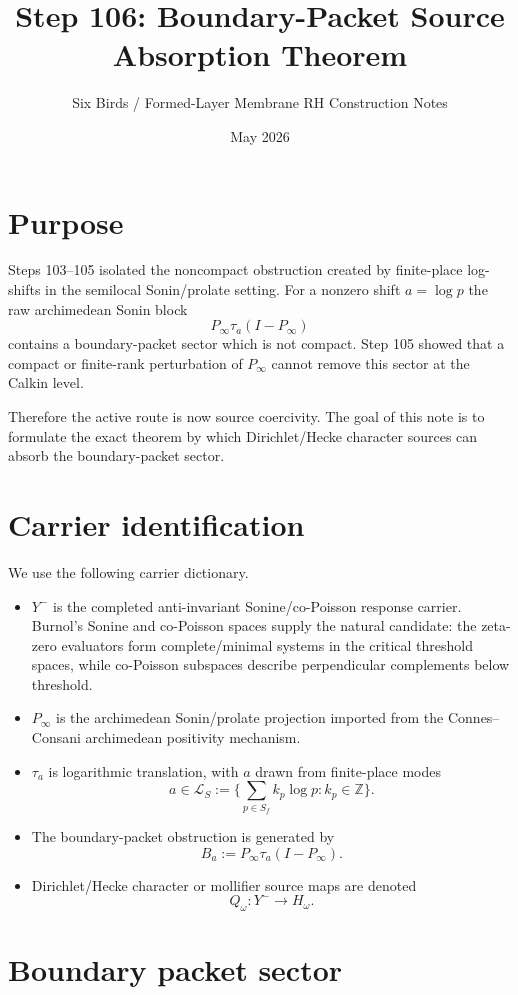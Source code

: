 \documentclass[11pt]{article}
\title{Step 106: Boundary-Packet Source Absorption Theorem}
\author{Six Birds / Formed-Layer Membrane RH Construction Notes}
\date{May 2026}
\begin{document}
\maketitle

\section{Purpose}
Steps 103--105 isolated the noncompact obstruction created by finite-place log-shifts in the semilocal Sonin/prolate setting.  For a nonzero shift $a=\log p$ the raw archimedean Sonin block
\[
  P_\infty\tau_a(I-P_\infty)
\]
contains a boundary-packet sector which is not compact.  Step 105 showed that a compact or finite-rank perturbation of $P_\infty$ cannot remove this sector at the Calkin level.

Therefore the active route is now source coercivity.  The goal of this note is to formulate the exact theorem by which Dirichlet/Hecke character sources can absorb the boundary-packet sector.

\section{Carrier identification}
We use the following carrier dictionary.

\begin{itemize}[leftmargin=2em]
\item $Y^-$ is the completed anti-invariant Sonine/co-Poisson response carrier.  Burnol's Sonine and co-Poisson spaces supply the natural candidate: the zeta-zero evaluators form complete/minimal systems in the critical threshold spaces, while co-Poisson subspaces describe perpendicular complements below threshold.
\item $P_\infty$ is the archimedean Sonin/prolate projection imported from the Connes--Consani archimedean positivity mechanism.
\item $\tau_a$ is logarithmic translation, with $a$ drawn from finite-place modes
\[
  a\in \mathcal L_S:=\Big\{\sum_{p\in S_f} k_p\log p:k_p\in\mathbb Z\Big\}.
\]
\item The boundary-packet obstruction is generated by
\[
  B_a:=P_\infty\tau_a(I-P_\infty).
\]
\item Dirichlet/Hecke character or mollifier source maps are denoted
\[
  Q_\omega:Y^-\to H_\omega.
\]
\end{itemize}

\section{Boundary packet sector}
\end{document}
